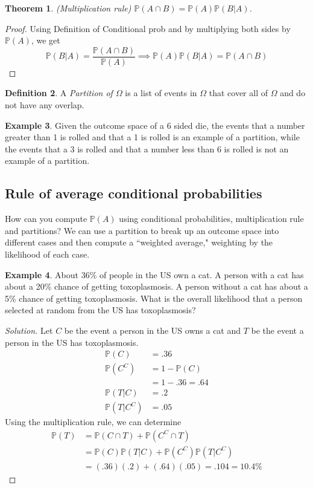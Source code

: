 \documentclass[12pt]{article}
\newcommand{\bbP}{\mathbb{P}}
\renewcommand{\_}[1]{\underline{ #1 }}
\newtheorem{theorem}{Theorem}[section]
\theoremstyle{definition}
\newtheorem{definition}[theorem]{Definition}
\newtheorem{example}[theorem]{Example}
\numberwithin{equation}{subsection}
\begin{document}
\begin{theorem}\label{multiplication rule}
(Multiplication rule) $\bbP(A\cap B)=\bbP(A)\bbP(B|A)$.
\end{theorem}

\begin{proof}
Using Definition of Conditional prob and by multiplying both sides by $\bbP(A)$, we get \\
\[
	\bbP(B|A)=\frac{\bbP(A\cap B)}{\bbP(A)} \implies \bbP(A) \bbP(B|A)=\bbP(A\cap B)
\]
\end{proof}

\begin{definition}
A \emph{Partition of $\Omega$} is a list of events in $\Omega$ that cover all of $\Omega$ and do not have any overlap.
\end{definition}

\begin{example}
Given the outcome space of a 6 sided die, the events that a number greater than 1 is rolled and that a 1 is rolled is an example of a partition, while the events that a 3 is rolled and that a number less than 6 is rolled is not an example of a partition.
\end{example}

\subsection{Rule of average conditional probabilities}
How can you compute $\bbP(A)$ using conditional probabilities, multiplication rule and partitions?
We can use a partition to break up an outcome space into different cases and then compute a ``weighted average," weighting by the likelihood of each case.

\begin{example}
	 About 36\% of people in the US own a cat. A person with a cat has about a 20\% chance of getting toxoplasmosis. A person without a cat has about a 5\% chance of getting toxoplasmosis. What is the overall likelihood that a person selected at random from the US has toxoplasmosis?
 		\begin{proof}[Solution]
			Let $C$ be the event a person in the US owns a cat and $T$ be the event a person in the US has toxoplasmosis. 
			\begin{align*}
				\bbP(C)&=.36 \\
				\bbP(C^C)&=1-\bbP(C) \\
				&=1-.36=.64 \\
				\bbP(T|C)&=.2 \\
				\bbP(T|C^C)&=.05
			\end{align*}
			Using the multiplication rule, we can determine
			\begin{align*}
				\bbP(T)&=\bbP(C \cap T)+\bbP(C^C \cap T) \\
				&=\bbP(C)\bbP(T|C)+\bbP(C^C)\bbP(T|C^C) \\
				&=(.36)(.2)+(.64)(.05)=.104=10.4\%
			\end{align*}
 		\end{proof}
 \end{example}
\end{document}
